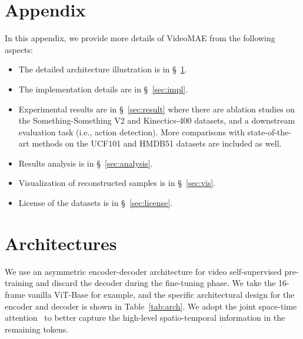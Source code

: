 \documentclass{article}
\begin{document}
\clearpage
\section*{Appendix}

In this appendix, we provide more details of VideoMAE from the following aspects:
\begin{itemize}
    \item The detailed architecture illustration is in \S~\ref{sec:arch}. 
    \item The implementation details are in \S~\ref{sec:impl}.
    \item Experimental results are in \S~\ref{sec:result} where there are ablation studies on the Something-Something V2 and Kinectics-400 datasets, and a downstream evaluation task (i.e., action detection). More comparisons with state-of-the-art methods on the UCF101 and HMDB51 datasets are included as well.
    \item Results analysis is in \S~\ref{sec:analysis}.
    \item Visualization of reconstructed samples is in \S~\ref{sec:vis}.
    \item License of the datasets is in \S~\ref{sec:license}.
\end{itemize}

\section{Architectures}\label{sec:arch}
We use an asymmetric encoder-decoder architecture for video self-supervised pre-training and discard the decoder during the fine-tuning phase. We take the 16-frame vanilla ViT-Base for example, and the specific architectural design for the encoder and decoder is shown in Table~\ref{tab:arch}. We adopt the joint space-time attention~\cite{vivit,liu2021video} to better capture the high-level spatio-temporal information in the remaining tokens.
\end{document}

